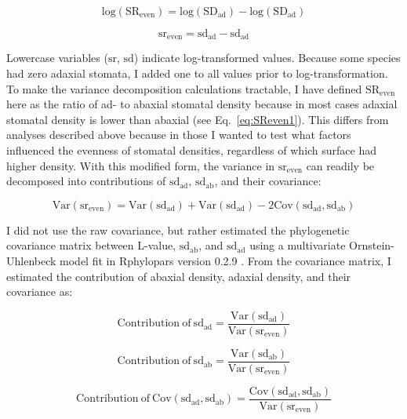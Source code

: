\documentclass[12pt, oneside]{article}
\newcommand{\pkg}[1]{{\fontseries{b}\selectfont #1}}
\newcommand{\el}{L-value}
\begin{document}
\begin{equation} \label{eq:logSReven} 
  \mathrm{log(SR_{even})} = \mathrm{log(SD_{ad})} - \mathrm{log(SD_{ad})}
\end{equation}

\begin{equation} \label{eq:SReven3} 
  \mathrm{sr_{even}} = \mathrm{sd_{ad}} - \mathrm{sd_{ad}}
\end{equation}

Lowercase variables ($\mathrm{sr}$, $\mathrm{sd}$) indicate log-transformed values. Because some species had zero adaxial stomata, I added one to all values prior to log-transformation. To make the variance decomposition calculations tractable, I have defined $\mathrm{SR_{even}}$ here as the ratio of ad- to abaxial stomatal density because in most cases adaxial stomatal density is lower than abaxial (see Eq.~\ref{eq:SReven1}). This differs from analyses described above because in those I wanted to test what factors influenced the evenness of stomatal densities, regardless of which surface had higher density. With this modified form, the variance in $\mathrm{sr_{even}}$ can readily be decomposed into contributions of $\mathrm{sd_{ad}}$, $\mathrm{sd_{ab}}$, and their covariance:

\begin{equation} \label{eq:varDecomp}
	\mathrm{Var(sr_{even})} = \mathrm{Var(sd_{ad})} + \mathrm{Var(sd_{ad})} - 2 \mathrm{Cov(sd_{ad}, sd_{ab})}
\end{equation}

I did not use the raw covariance, but rather estimated the phylogenetic covariance matrix between \el, $\mathrm{sd_{ab}}$, and $\mathrm{sd_{ad}}$ using a multivariate Ornstein-Uhlenbeck model fit in \pkg{Rphylopars} version 0.2.9 \citep{Goolsby_etal_2016, Goolsby_etal_2017}. From the covariance matrix, I estimated the contribution of abaxial density, adaxial density, and their covariance as:

\begin{equation} \label{eq:contribution_ad}
	\mathrm{Contribution~of~sd_{ad}} = \frac{\mathrm{Var(sd_{ad})}}{\mathrm{Var(sr_{even})}}
\end{equation}

\begin{equation} \label{eq:contribution_ab}
 \mathrm{Contribution~of~sd_{ab}} = \frac{\mathrm{Var(sd_{ab})}}{\mathrm{Var(sr_{even})}}
\end{equation}

\begin{equation} \label{eq:contribution_cov}
 \mathrm{Contribution~of~Cov(sd_{ad}, sd_{ab})} = \frac{\mathrm{Cov(sd_{ad}, sd_{ab})}}{\mathrm{Var(sr_{even})}}
\end{equation}
\end{document}

